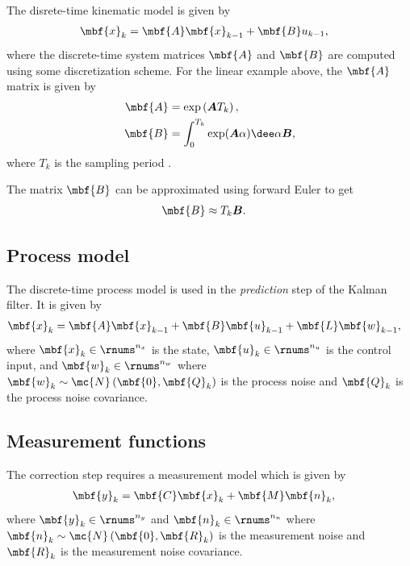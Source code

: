 \documentclass[nobib, nofonts, notoc]{tufte-handout}
\begin{document}
    The disrete-time kinematic model is given by
    \begin{align}
        \mbf{x}_{k} &= \mbf{A}\mbf{x}_{k-1} + \mbf{B}u_{k-1},        
    \end{align}
    where the discrete-time system matrices $\mbf{A}$ and $\mbf{B}$ are computed using some discretization scheme. For the linear example above, the $\mbf{A}$ matrix is given by
    \begin{align}
        \mbf{A} &= \exp\left( \boldsymbol{A} T_{k} \right),\\
        \mbf{B} &= \int_{0}^{T_{k}}\exp(\boldsymbol{A}\alpha)\dee\alpha \boldsymbol{B},
    \end{align}
    where $T_{k}$ is the sampling period \cite{Farrell_Aided_2008}.
     
    The matrix $\mbf{B}$ can be approximated using forward Euler to get
    \begin{align}
        \mbf{B} &\approx T_{k}\boldsymbol{B}.
    \end{align}

    \subsection{Process model}
    The discrete-time process model is used in the \emph{prediction} step of the Kalman filter. It is given by
    \begin{align}
        \label{eq:DT linear process model}
        \mbf{x}_{k} &= \mbf{A}\mbf{x}_{k-1} + \mbf{B}\mbf{u}_{k-1} + \mbf{L}\mbf{w}_{k-1},
    \end{align}
    where $\mbf{x}_{k}\in\rnums^{n_{x}}$ is the state, $\mbf{u}_{k}\in\rnums^{n_{u}}$ is the control input, and $\mbf{w}_{k}\in\rnums^{n_{w}}$ where $\mbf{w}_{k}\sim\mc{N}\left( \mbf{0}, \mbf{Q}_{k} \right)$ is the process noise and $\mbf{Q}_{k}$ is the process noise covariance. 

    \subsection{Measurement functions}
    The correction step requires a measurement model which is given by
    \begin{align}
        \mbf{y}_{k} &= \mbf{C}\mbf{x}_{k} + \mbf{M}\mbf{n}_{k},
    \end{align}
    where $\mbf{y}_{k}\in\rnums^{n_{y}}$ and $\mbf{n}_{k}\in\rnums^{n_{n}}$ where $\mbf{n}_{k}\sim\mc{N}\left( \mbf{0}, \mbf{R}_{k} \right)$ is the measurement noise and $\mbf{R}_{k}$ is the measurement noise covariance.
\end{document}
